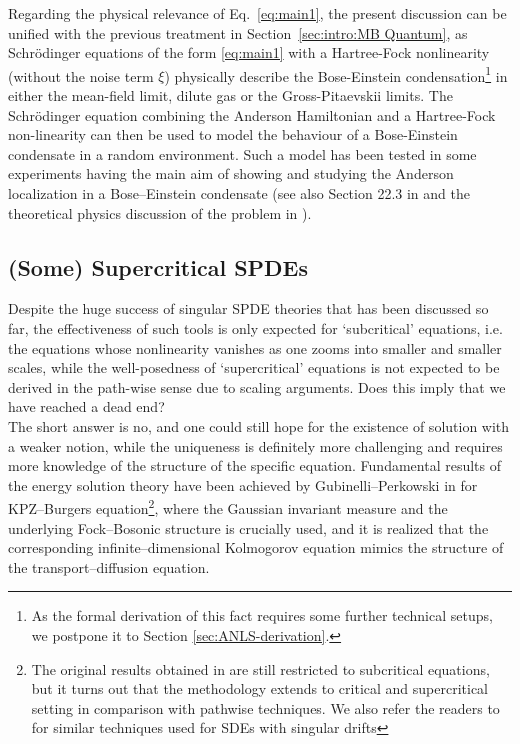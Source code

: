 Regarding the physical relevance of Eq.~\eqref{eq:main1}, the present discussion can be unified with the previous treatment in Section~\ref{sec:intro:MB Quantum}, as Schr{\"o}dinger equations of the form \eqref{eq:main1} with a Hartree-Fock nonlinearity (without the noise term $\xi$) physically describe the Bose-Einstein condensation\footnote{As the formal derivation of this fact requires some further technical setups, we postpone it to Section \ref{sec:ANLS-derivation}.} in either the mean-field limit, dilute gas or the Gross-Pitaevskii limits. The Schr{\"o}dinger equation combining the
Anderson Hamiltonian and a Hartree-Fock non-linearity can then be used to
model the behaviour of a Bose-Einstein condensate in a random environment. Such a model has been tested in some experiments having the main aim of
showing and studying the Anderson localization in a Bose--Einstein condensate {\cite{billy2008direct,Nature08}} (see also Section 22.3 in
{\cite{pitaevskii2016bose}} and the theoretical physics discussion of the
problem in {\cite{shapiro2012cold}}).

\subsection{(Some) Supercritical SPDEs}
Despite the huge success of singular SPDE theories that has been discussed so far, the effectiveness of such tools is only expected for `subcritical' equations, i.e. the equations whose nonlinearity vanishes as one zooms into smaller and smaller scales, while the well-posedness of `supercritical' equations is not expected to be derived in the path-wise sense due to scaling arguments. Does this imply that we have reached a dead end?\\

The short answer is no, and one could still hope for the existence of solution with a weaker notion, while the uniqueness is definitely more challenging and requires more knowledge of the structure of the specific equation. Fundamental results of the energy solution theory have been achieved by Gubinelli--Perkowski in \cite{GubinelliPerkowski2018, GubinelliPerkowski2020} for KPZ--Burgers equation\footnote{The original results obtained in \cite{GubinelliPerkowski2018, GubinelliPerkowski2020} are still restricted to subcritical equations, but it turns out that the methodology extends to critical and supercritical setting in comparison with pathwise techniques. We also refer the readers to \cite{graefner2024weakwellposednessenergysolutions,graefner2025energysolutionssdessupercritical} for similar techniques used for SDEs with singular drifts}, where the Gaussian invariant measure and the underlying Fock--Bosonic structure is crucially used, and it is realized that the corresponding infinite--dimensional Kolmogorov equation mimics the structure of the transport--diffusion equation.

